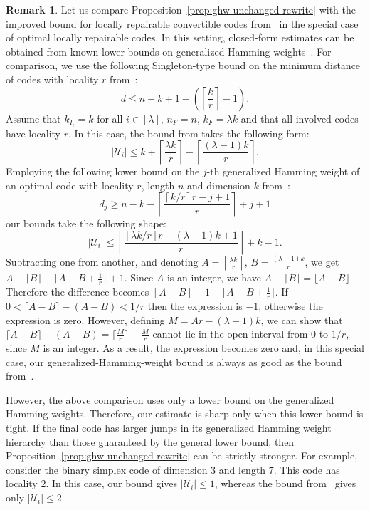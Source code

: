 \documentclass[conference, 10pt]{IEEEtran}
\theoremstyle{plain}
\theoremstyle{definition}
\newtheorem{remark}[definition]{Remark}
\newcommand{\mC}{\mathcal{C}}
\newcommand{\mU}{\mathcal{U}}
\newcommand{\ben}[1]{{\color{red}(Ben: #1)}}
\begin{document}
\begin{remark}\label{remark:unchanged-LRC}
Let us compare Proposition~\ref{prop:ghw-unchanged-rewrite} with the improved bound for
locally repairable convertible codes from~\cite{ge2025locally} in the special case of
optimal locally repairable codes. In this setting, closed-form estimates can be obtained
from known lower bounds on generalized Hamming weights~\cite{hao2020generalized}. For comparison, we use the following Singleton-type bound on the minimum
distance of codes with locality $r$ from~\cite{gopalan2012locality}: $$d \leq n-k+1-\left(\left\lceil \frac{k}{r}\right\rceil-1\right).$$ Assume
that $k_{I_i}=k$ for all \(i\in[\lambda]\), \(n_F=n\), $k_F=\lambda k$ and that all involved codes
have locality $r$. In this case, the bound from \cite{ge2025locally} takes the following form: $$|\mU_i|
 \leq
 k+\left\lceil \frac{\lambda k}{r}\right\rceil
 -\left\lceil \frac{(\lambda-1)k}{r}\right\rceil.$$ Employing the following lower bound on the
$j$-th generalized Hamming weight of an optimal code with locality $r$, length $n$ and dimension $k$ from~\cite[Theorem~4]{hao2020generalized}: %
$$d_j
\geq
n-k
-
\left\lceil
\frac{\left\lceil k/r\right\rceil r-j+1}{r}
\right\rceil
+j+1$$ our bounds take the following shape: $$|\mU_i|\leq
\left\lceil
\frac{
\left\lceil \lambda k/r\right\rceil r-(\lambda-1)k+1
}{r}
\right\rceil
+k-1.$$ Subtracting one from another,
and denoting $A=\left\lceil \frac{\lambda k}{r}\right\rceil$, $B=\frac{(\lambda-1)k}{r}$, we get $A-\lceil B\rceil
-
\lceil A-B+\frac{1}{r}\rceil
+1$. Since $A$ is an integer, we have $A-\lceil B\rceil=\lfloor A-B\rfloor$. Therefore the difference becomes $\left\lfloor A-B\right\rfloor + 1
-
\lceil A-B+\frac{1}{r}\rceil$. If $0 < \lceil A - B \rceil - (A-B) < 1/r$ then the expression is $-1$, otherwise the expression is zero.
However, defining $M=Ar-(\lambda-1)k$, we can show that $\lceil A - B \rceil - (A-B)=\lceil
\frac{M}{r}\rceil-\frac{M}{r}$ cannot lie in the open interval from $0$ to $1/r$, since $M$ is an integer. As a result, the expression becomes zero and, in this special case, our generalized-Hamming-weight bound is always as good as the bound from~\cite{ge2025locally}. 

However, the above comparison uses only a lower bound on the generalized Hamming
weights. Therefore, our estimate is sharp only when this lower bound is tight. If the final code has larger jumps in its generalized Hamming weight hierarchy than those guaranteed
by the general lower bound, then Proposition~\ref{prop:ghw-unchanged-rewrite} can be strictly stronger.
For example, consider the binary simplex code of dimension $3$ and length $7$. This code
has locality $2$. In this case, our bound gives $|\mU_i|\leq 1$, whereas the bound from~\cite{ge2025locally} gives only $|\mU_i|\leq 2$.
\end{remark}
\end{document}
